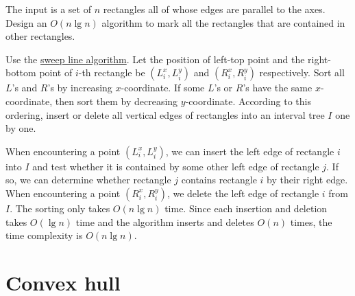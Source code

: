 \begin{Exercise}[origin={NCTU CSIE 93}]
The input is a set of $n$ rectangles all of whose edges are parallel to the axes. Design an $O(n \lg n)$ algorithm to mark all the rectangles that are contained in other rectangles.
\end{Exercise}
\begin{Answer}
Use the \href{https://en.wikipedia.org/wiki/Sweep_line_algorithm}{sweep line algorithm}. Let the position of left-top point and the right-bottom point of $i$-th rectangle be $(L^x_i, L^y_ i)$ and $(R^x_i, R^y_i)$ respectively. Sort all $L$'s and $R$'s by increasing $x$-coordinate. If some $L$'s or $R$'s have the same $x$-coordinate, then sort them by decreasing $y$-coordinate. According to this ordering, insert or delete all vertical edges of rectangles into an interval tree $I$ one by one. 

When encountering a point $(L^x_i, L^y_ i)$, we can insert the left edge of rectangle $i$ into $I$ and test whether it is contained by some other left edge of rectangle $j$. If so, we can determine whether rectangle $j$ contains rectangle $i$ by their right edge. When encountering a point $(R^x_i, R^y_i)$, we delete the left edge of rectangle $i$ from $I$. The sorting only takes $O(n \lg n)$ time. Since each insertion and deletion takes $O(\lg n)$ time and the algorithm inserts and deletes $O(n)$ times, the time complexity is $O(n \lg n)$.
\end{Answer}


\section{Convex hull}


